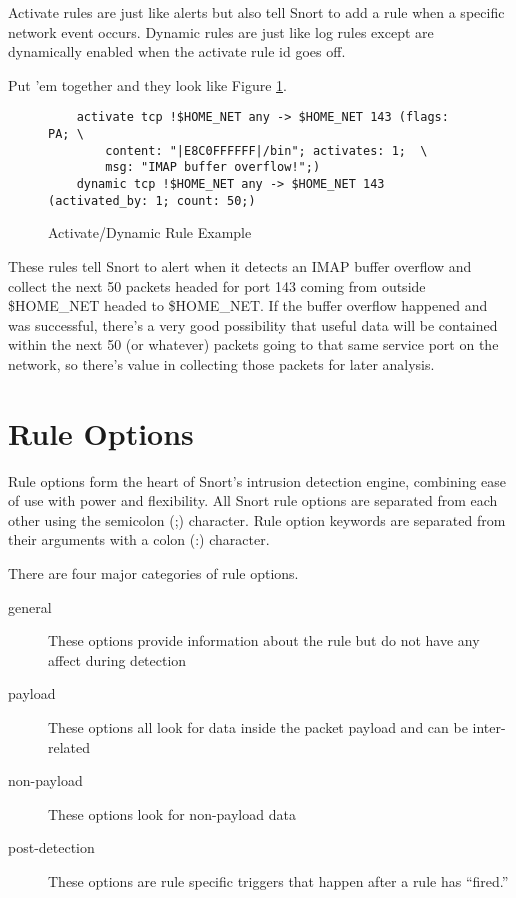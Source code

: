 \documentclass[english]{report}
\begin{document}
Activate rules are just like alerts but also tell Snort to add a rule when a
specific network event occurs. Dynamic rules are just like log rules except are
dynamically enabled when the activate rule id goes off. 

Put 'em together and they look like Figure \ref{activate/dynamic rule example}.

\begin{figure}
\begin{verbatim}
    activate tcp !$HOME_NET any -> $HOME_NET 143 (flags: PA; \
        content: "|E8C0FFFFFF|/bin"; activates: 1;  \
        msg: "IMAP buffer overflow!";)
    dynamic tcp !$HOME_NET any -> $HOME_NET 143 (activated_by: 1; count: 50;)
\end{verbatim}

\caption{Activate/Dynamic Rule Example}
\label{activate/dynamic rule example}
\end{figure}

These rules tell Snort to alert when it detects an IMAP buffer overflow and
collect the next 50 packets headed for port 143 coming from outside \$HOME\_NET
headed to \$HOME\_NET. If the buffer overflow happened and was successful,
there's a very good possibility that useful data will be contained within the
next 50 (or whatever) packets going to that same service port on the network,
so there's value in collecting those packets for later analysis.

\section{Rule Options}

Rule options form the heart of Snort's intrusion detection engine, combining
ease of use with power and flexibility. All Snort rule options are separated
from each other using the semicolon (;) character. Rule option keywords are
separated from their arguments with a colon (:) character. 

There are four major categories of rule options.  

\begin{description}

\item [general] These options provide information about the rule but do not
have any affect during detection 

\item [payload] These options all look for data inside the packet payload and
can be inter-related

\item [non-payload] These options look for non-payload data

\item [post-detection] These options are rule specific triggers that happen
after a rule has ``fired.''

\end{description}
\end{document}

